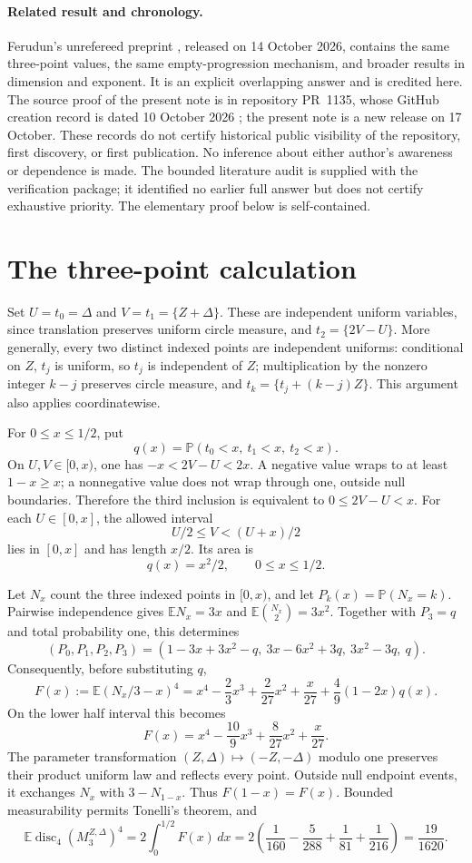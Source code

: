 \documentclass[11pt]{article}
\newcommand{\E}{\mathbb E}
\newcommand{\Prob}{\mathbb P}
\newcommand{\disc}{\operatorname{disc}}
\begin{document}
\paragraph{Related result and chronology.}
Ferudun's unrefereed preprint \cite[Theorems~1.2--1.3]{Ferudun},
released on 14 October 2026, contains the same three-point values,
the same empty-progression mechanism, and broader results in dimension
and exponent. It is an explicit overlapping answer and is credited here.
The source proof of the present note is in repository
PR~1135, whose GitHub creation record is dated 10 October 2026
\cite{Repository}; the present note is a new release on 17 October.
These records do not certify historical public visibility of the repository,
first discovery, or first publication. No inference about either author's
awareness or dependence is made. The bounded literature audit is supplied
with the verification package; it identified no earlier full answer but
does not certify exhaustive priority. The elementary proof below is
self-contained.

\section{The three-point calculation}
Set $U=t_0=\Delta$ and $V=t_1=\{Z+\Delta\}$. These are independent uniform
variables, since translation preserves uniform circle measure, and
$t_2=\{2V-U\}$. More generally, every two distinct indexed points are
independent uniforms: conditional on $Z$, $t_j$ is uniform, so $t_j$
is independent of $Z$; multiplication by the nonzero integer $k-j$
preserves circle measure, and
$t_k=\{t_j+(k-j)Z\}$. This argument also applies coordinatewise.

For $0\le x\le1/2$, put
\[
 q(x)=\Prob(t_0<x,\ t_1<x,\ t_2<x).
\]
On $U,V\in[0,x)$, one has $-x<2V-U<2x$. A negative value wraps to
at least $1-x\ge x$; a nonnegative value does not wrap through one,
outside null boundaries. Therefore the third inclusion is equivalent to
$0\le2V-U<x$. For each $U\in[0,x]$, the allowed interval
\[
 U/2\le V<(U+x)/2
\]
lies in $[0,x]$ and has length $x/2$. Its area is
\[
 q(x)=x^2/2,\qquad 0\le x\le1/2.
\]

Let $N_x$ count the three indexed points in $[0,x)$, and let
$P_k(x)=\Prob(N_x=k)$. Pairwise independence gives
$\E N_x=3x$ and $\E\binom{N_x}{2}=3x^2$. Together with $P_3=q$ and
total probability one, this determines
\[
 (P_0,P_1,P_2,P_3)
 =(1-3x+3x^2-q,\ 3x-6x^2+3q,\ 3x^2-3q,\ q).
\]
Consequently, before substituting $q$,
\begin{equation}\label{eq:general}
 F(x):=\E(N_x/3-x)^4
 =x^4-\frac23x^3+\frac2{27}x^2+\frac{x}{27}
                         +\frac49(1-2x)q(x).
\end{equation}
On the lower half interval this becomes
\[
 F(x)=x^4-\frac{10}{9}x^3+\frac8{27}x^2+\frac{x}{27}.
\]
The parameter transformation $(Z,\Delta)\mapsto(-Z,-\Delta)$ modulo one
preserves their product uniform law and reflects every point. Outside
null endpoint events, it exchanges $N_x$ with $3-N_{1-x}$.
Thus $F(1-x)=F(x)$. Bounded measurability permits Tonelli's theorem, and
\[
 \E\disc_4(M_3^{Z,\Delta})^4
 =2\int_0^{1/2}F(x)\,dx
 =2\left(\frac1{160}-\frac5{288}+\frac1{81}+\frac1{216}\right)
 =\frac{19}{1620}.
\]
\end{document}
